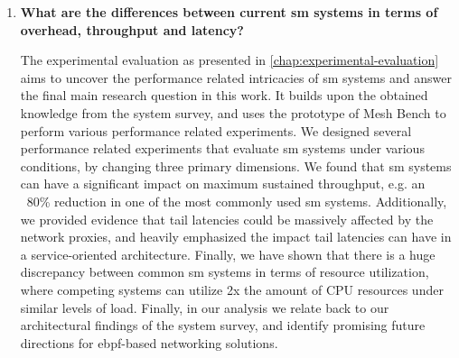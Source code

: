 \begin{enumerate}[label=\textbf{RQ\arabic*}, leftmargin=3\parindent]
    \item \textbf{What are the differences between current \gls{sm} systems in terms of overhead, throughput and latency?}
    \label{rq-3:ans}
    
    The experimental evaluation as presented in \cref{chap:experimental-evaluation} aims to uncover the performance related intricacies of \gls{sm} systems and answer the final main research question in this work. It builds upon the obtained knowledge from the system survey, and uses the prototype of Mesh Bench to perform various performance related experiments. We designed several performance related experiments that evaluate \gls{sm} systems under various conditions, by changing three primary dimensions. We found that \gls{sm} systems can have a significant impact on maximum sustained throughput, e.g. an ~80\% reduction in one of the most commonly used \gls{sm} systems. Additionally, we provided evidence that tail latencies could be massively affected by the network proxies, and heavily emphasized the impact tail latencies can have in a service-oriented architecture. Finally, we have shown that there is a huge discrepancy between common \gls{sm} systems in terms of resource utilization, where competing systems can utilize 2x the amount of CPU resources under similar levels of load. Finally, in our analysis we relate back to our architectural findings of the system survey, and identify promising future directions for \gls{ebpf}-based networking solutions.

\end{enumerate}